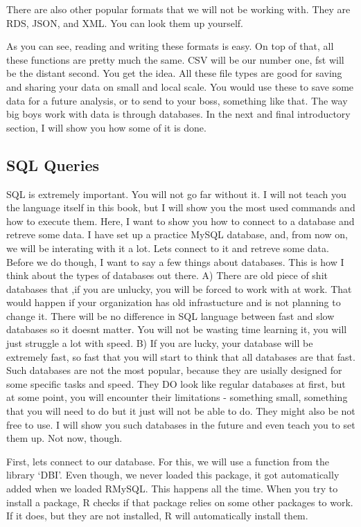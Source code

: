 \documentclass[]{book}
\begin{document}
There are also other popular formats that we will not be working with. They are RDS, JSON, and XML. You can look them up yourself.

As you can see, reading and writing these formats is easy. On top of that, all these functions are pretty much the same. CSV will be our number one, fst will be the distant second. You get the idea. All these file types are good for saving and sharing your data on small and local scale. You would use these to save some data for a future analysis, or to send to your boss, something like that. The way big boys work with data is through databases. In the next and final introductory section, I will show you how some of it is done.

\hypertarget{sql-queries}{%
\subsection{SQL Queries}\label{sql-queries}}

SQL is extremely important. You will not go far without it. I will not teach you the language itself in this book, but I will show you the most used commands and how to execute them. Here, I want to show you how to connect to a database and retreve some data. I have set up a practice MySQL database, and, from now on, we will be interating with it a lot. Lets connect to it and retreve some data. Before we do though, I want to say a few things about databases. This is how I think about the types of databases out there. A) There are old piece of shit databases that ,if you are unlucky, you will be forced to work with at work. That would happen if your organization has old infrastucture and is not planning to change it. There will be no difference in SQL language between fast and slow databases so it doesnt matter. You will not be wasting time learning it, you will just struggle a lot with speed. B) If you are lucky, your database will be extremely fast, so fast that you will start to think that all databases are that fast. Such databases are not the most popular, because they are usially designed for some specific tasks and speed. They DO look like regular databases at first, but at some point, you will encounter their limitations - something small, something that you will need to do but it just will not be able to do. They might also be not free to use. I will show you such databases in the future and even teach you to set them up. Not now, though.

First, lets connect to our database. For this, we will use a function from the library `DBI'. Even though, we never loaded this package, it got automatically added when we loaded RMySQL. This happens all the time. When you try to install a package, R checks if that package relies on some other packages to work. If it does, but they are not installed, R will automatically install them.
\end{document}
